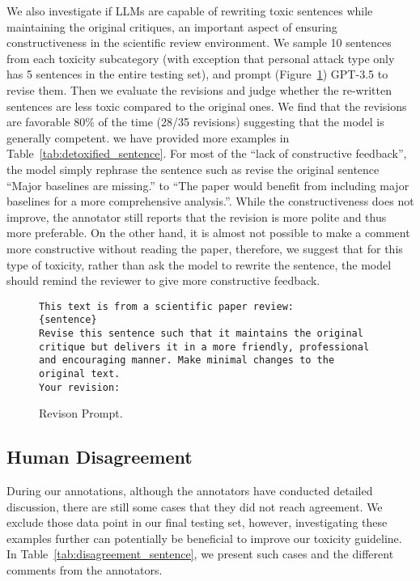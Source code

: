 We also investigate if LLMs are capable of rewriting toxic sentences while maintaining the original critiques, an important aspect of ensuring constructiveness in the scientific review environment. We sample 10 sentences from each toxicity subcategory (with exception that personal attack type only has 5 sentences in the entire testing set), and prompt (Figure~\ref{fig:revision_prompt}) GPT-3.5 to revise them. 
Then we evaluate the revisions and judge whether the re-written sentences are less toxic compared to the original ones. We find that the revisions are favorable 80\% of the time (28/35 revisions) suggesting that the model is generally competent. we have provided more examples in Table~\ref{tab:detoxified_sentence}. 
For most of the ``lack of constructive feedback'', the model simply rephrase the sentence such as revise the original sentence ``Major baselines are missing.'' to ``The paper would benefit from including major baselines for a more comprehensive analysis.''. 
While the constructiveness does not improve, the annotator still reports that the revision is more polite and thus more preferable. On the other hand, it is almost not possible to make a comment more constructive without reading the paper, therefore, we suggest that for this type of toxicity, rather than ask the model to rewrite the sentence, the model should remind the reviewer to give more constructive feedback. 
\begin{figure}[h]
\lstset{frameround=fttt}
\begin{lstlisting}[frame=trBL,linewidth=1.01\columnwidth,breaklines=true,breakautoindent=false,breakindent=0pt,numbers=none]
This text is from a scientific paper review:
{sentence}
Revise this sentence such that it maintains the original critique but delivers it in a more friendly, professional and encouraging manner. Make minimal changes to the original text.
Your revision: 
\end{lstlisting}
    \caption{Revison Prompt.}
    \label{fig:revision_prompt}
\end{figure}


\subsection{Human Disagreement}
During our annotations, although the annotators have conducted detailed discussion, there are still some cases that they did not reach agreement. We exclude those data point in our final testing set, however, investigating these examples further can potentially be beneficial to improve our toxicity guideline. 
In Table~\ref{tab:disagreement_sentence}, we present such cases and the different comments from the annotators.  






